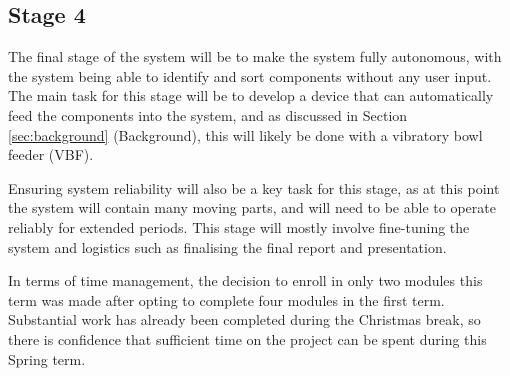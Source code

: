 \subsection{Stage 4}
The final stage of the system will be to make the system fully autonomous, with the system being able to identify and sort components without any user input.
The main task for this stage will be to develop a device that can automatically feed the components into the system, and as 
discussed in Section \ref{sec:background} (Background), this will likely be done with a vibratory bowl feeder (VBF).

Ensuring system reliability will also be a key task for this stage, as at this point the system will contain many moving parts, and will need to be able to
operate reliably for extended periods. This stage will mostly involve fine-tuning the system and logistics such as
finalising the final report and presentation.

\noindent
In terms of time management, the decision to enroll in only two modules this term was made after opting to complete four modules in the first term. Substantial work has already been completed
during the Christmas break, so there is confidence that sufficient time on the project can be spent during this Spring term.

